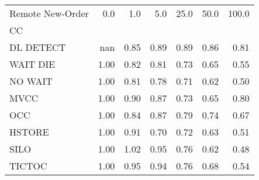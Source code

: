 \begin{tabular}{lrrrrrr}
\toprule
Remote New-Order &  0.0   &  1.0   &  5.0   &  25.0  &  50.0  &  100.0 \\
CC        &        &        &        &        &        &        \\
\midrule
DL DETECT &    nan &   0.85 &   0.89 &   0.89 &   0.86 &   0.81 \\
WAIT DIE  &   1.00 &   0.82 &   0.81 &   0.73 &   0.65 &   0.55 \\
NO WAIT   &   1.00 &   0.81 &   0.78 &   0.71 &   0.62 &   0.50 \\
MVCC      &   1.00 &   0.90 &   0.87 &   0.73 &   0.65 &   0.80 \\
OCC       &   1.00 &   0.84 &   0.87 &   0.79 &   0.74 &   0.67 \\
HSTORE    &   1.00 &   0.91 &   0.70 &   0.72 &   0.63 &   0.51 \\
SILO      &   1.00 &   1.02 &   0.95 &   0.76 &   0.62 &   0.48 \\
TICTOC    &   1.00 &   0.95 &   0.94 &   0.76 &   0.68 &   0.54 \\
\bottomrule
\end{tabular}
